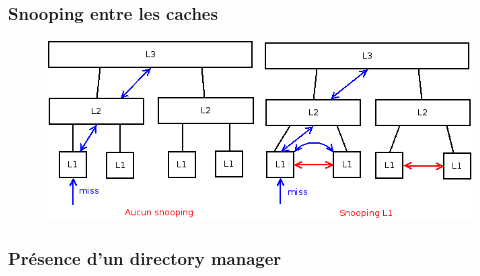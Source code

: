 \begin{frame}
  \frametitle{Snooping entre les caches}
  
  \begin{figure}[h!]
    \includegraphics[width=.8\textwidth]{images/DiagrammeSnooping.png}
  \end{figure}  
  
\end{frame}


\begin{frame}
  \frametitle{Présence d'un directory manager}
  
\end{frame}
